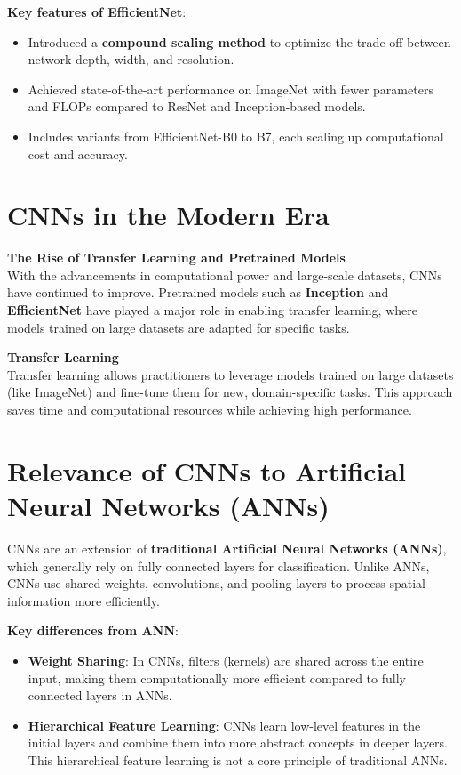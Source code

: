 \textbf{Key features of EfficientNet}:
\begin{itemize}
    \item Introduced a \textbf{compound scaling method} to optimize the trade-off between network depth, width, and resolution.
    \item Achieved state-of-the-art performance on ImageNet with fewer parameters and FLOPs compared to ResNet and Inception-based models.
    \item Includes variants from EfficientNet-B0 to B7, each scaling up computational cost and accuracy.
\end{itemize}

\section{CNNs in the Modern Era}

\textbf{The Rise of Transfer Learning and Pretrained Models}\\
With the advancements in computational power and large-scale datasets, CNNs have continued to improve. Pretrained models such as \textbf{Inception}\cite{szegedy2015googlenet} and \textbf{EfficientNet}\cite{efficientnet} have played a major role in enabling transfer learning, where models trained on large datasets are adapted for specific tasks.

\textbf{Transfer Learning}\\
Transfer learning allows practitioners to leverage models trained on large datasets (like ImageNet) and fine-tune them for new, domain-specific tasks. This approach saves time and computational resources while achieving high performance.

\section{Relevance of CNNs to Artificial Neural Networks (ANNs)}
CNNs are an extension of \textbf{traditional Artificial Neural Networks (ANNs)}, which generally rely on fully connected layers for classification. Unlike ANNs, CNNs use shared weights, convolutions, and pooling layers to process spatial information more efficiently.

\textbf{Key differences from ANN}:
\begin{itemize}
    \item \textbf{Weight Sharing}: In CNNs, filters (kernels) are shared across the entire input, making them computationally more efficient compared to fully connected layers in ANNs.\cite{bengio2009learning}
    \item \textbf{Hierarchical Feature Learning}: CNNs learn low-level features in the initial layers and combine them into more abstract concepts in deeper layers. This hierarchical feature learning is not a core principle of traditional ANNs.
\end{itemize}